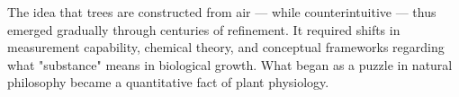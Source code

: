 \begin{historical}
The idea that trees are constructed from air — while counterintuitive — thus emerged gradually through centuries of refinement. It required shifts in measurement capability, chemical theory, and conceptual frameworks regarding what "substance" means in biological growth. What began as a puzzle in natural philosophy became a quantitative fact of plant physiology.
\end{historical}
